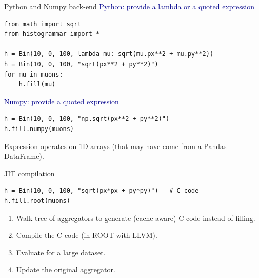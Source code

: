 \documentclass[aspectratio=169]{beamer}
\begin{document}
\begin{frame}[fragile]{Python and Numpy back-end}
\vspace{0.5 cm}
\textcolor{darkblue}{\large Python: provide a lambda or a quoted expression}

\begin{verbatim}
from math import sqrt
from histogrammar import *

h = Bin(10, 0, 100, lambda mu: sqrt(mu.px**2 + mu.py**2))
h = Bin(10, 0, 100, "sqrt(px**2 + py**2)")
for mu in muons:
    h.fill(mu)
\end{verbatim}

\vspace{0.25 cm}
\textcolor{darkblue}{\large Numpy: provide a quoted expression}

\begin{verbatim}
h = Bin(10, 0, 100, "np.sqrt(px**2 + py**2)")
h.fill.numpy(muons)
\end{verbatim}

Expression operates on 1D arrays (that may have come from a Pandas DataFrame).

\vspace{0.25 cm}
\vspace{0.25 cm}
\end{frame}

\begin{frame}[fragile]{JIT compilation}
\begin{verbatim}
h = Bin(10, 0, 100, "sqrt(px*px + py*py)")   # C code
h.fill.root(muons)
\end{verbatim}

\begin{enumerate}\setlength{\itemsep}{0.3 cm}
\item Walk tree of aggregators to generate (cache-aware) C code instead of filling.
\item Compile the C code (in ROOT with LLVM).
\item Evaluate for a large dataset.
\item Update the original aggregator.
\end{enumerate}

\vspace{0.25 cm}
\end{frame}
\end{document}
